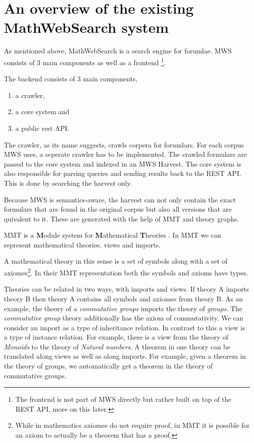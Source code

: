 \documentclass[11pt]{article}
\begin{document}
\section{An overview of the existing MathWebSearch system}
\label{sec:mws}

As mentioned above, MathWebSearch is a search engine for forumlae. MWS consists of 3 main components as well as a frontend \footnote{The frontend is not part of MWS directly but rather built on top of the REST API, more on this later. }\cite{KohPro:MWSmanual}.

The backend consists of 3 main components,
\begin{enumerate}
  \item a crawler,
  \item a core system and
  \item a public rest API.
\end{enumerate}

The crawler, as its name suggests, crawls corpera for forumlars. For each corpus MWS uses, a seperate crawler has to be implemented. The crawled formulars are passed to the core system and indexed in an MWS Harvest. The core system is also responsible for parsing queries and sending results back to the REST API. This is done by searching the harvest only.

Because MWS is semantics-aware, the harvest can not only contain the exact formulars that are found in the original corpus but also all versions that are quivalent to it. These are generated with the help of MMT and theory graphs.

MMT is a \textbf{M}odule system for \textbf{M}athematical \textbf{T}heories \cite{RabKoh:WSMSML13}. In MMT we can represent mathematical theories, views and imports.

A mathematical theory in this sense is a set of symbols along with a set of axiomes\footnote{While in mathematics axiomes do not require proof, in MMT it is possible for an axiom to actually be a theorem that has a proof. }. In their MMT representation both the symbols and axioms have types.

Theories can be related in two ways, with imports and views. If theory A imports theory B then theory A contains all symbols and axiomes from theory B. As an example, the theory of a \textit{commutative groups} imports the theory of \textit{groups}. The \textit{commutative group} theory additionally has the axiom of commutativity. We can consider an import as a type of inheritance relation. In contrast to this a view is a type of instance relation. For example, there is a view from the theory of \textit{Monoids} to the theory of \textit{Natural numbers}. A theorem in one theory can be translated along views as well as along imports. For example, given a theorem in the theory of groups, we automatically get a theorem in the theory of commutative groups.
\end{document}
